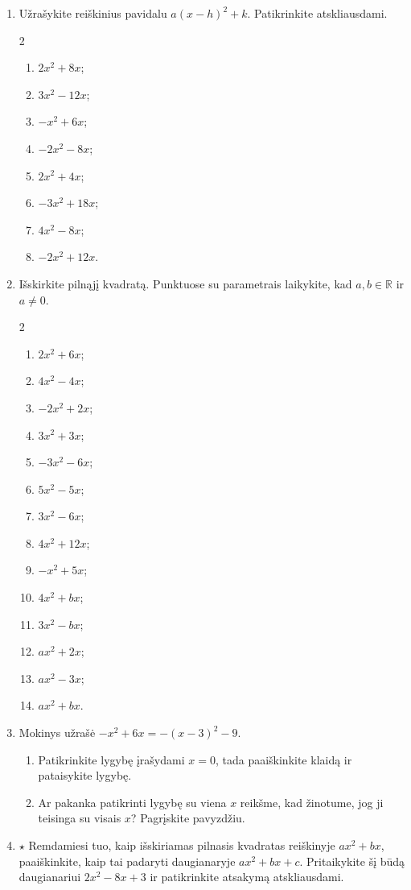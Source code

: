\documentclass[12pt,a4paper]{article}
\begin{document}
\begin{enumerate}
\textbf{Sustok ir apibendrink.} Kaip išskirti pilnąjį kvadratą reiškinyje $ax^2+bx$?

\item Užrašykite reiškinius pavidalu $a(x-h)^2+k$. Patikrinkite atskliausdami.
\begin{multicols}{2}\begin{enumerate}
\item $2x^2+8x$; \item $3x^2-12x$; \item $-x^2+6x$; \item $-2x^2-8x$; \item $2x^2+4x$; \item $-3x^2+18x$; \item $4x^2-8x$; \item $-2x^2+12x$.
\end{enumerate}\end{multicols}
\item Išskirkite pilnąjį kvadratą. Punktuose su parametrais laikykite, kad $a,b\in\mathbb R$ ir $a\ne0$.
\begin{multicols}{2}\begin{enumerate}
\item $2x^2+6x$; \item $4x^2-4x$; \item $-2x^2+2x$; \item $3x^2+3x$; \item $-3x^2-6x$; \item $5x^2-5x$;
\item $3x^2-6x$;
\item $4x^2+12x$;
\item $-x^2+5x$;
\item $4x^2+bx$;
\item $3x^2-bx$;
\item $ax^2+2x$;
\item $ax^2-3x$;
\item $ax^2+bx$.
\end{enumerate}\end{multicols}
\item Mokinys užrašė $-x^2+6x=-(x-3)^2-9$.
\begin{enumerate}
\item Patikrinkite lygybę įrašydami $x=0$, tada paaiškinkite klaidą ir pataisykite lygybę.
\item Ar pakanka patikrinti lygybę su viena $x$ reikšme, kad žinotume, jog ji teisinga su visais $x$? Pagrįskite pavyzdžiu.
\end{enumerate}
\item $\star$ Remdamiesi tuo, kaip išskiriamas pilnasis kvadratas reiškinyje $ax^2+bx$, paaiškinkite, kaip tai padaryti daugianaryje $ax^2+bx+c$. Pritaikykite šį būdą daugianariui $2x^2-8x+3$ ir patikrinkite atsakymą atskliausdami.


\end{enumerate}
\end{document}
